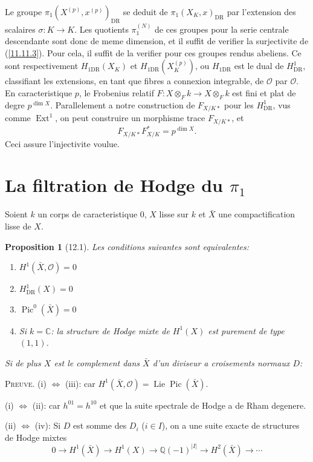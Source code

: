 \documentclass[12pt,a4paper]{article}
\theoremstyle{plain}
\newtheorem{proposition}[theorem]{Proposition}
\theoremstyle{definition}
\theoremstyle{remark}
\DeclareMathOperator{\Lie}{Lie}
\DeclareMathOperator{\Ext}{Ext}
\DeclareMathOperator{\Pic}{Pic}
\newcommand{\Q}{\mathbb{Q}}
\newcommand{\C}{\mathbb{C}}
\newcommand{\DR}{\mathrm{DR}}
\begin{document}
Le groupe $\pi_1(X^{(p)}, x^{(p)})_{\DR}$ se deduit de $\pi_1(X_K, x)_{\DR}$ par l'extension des scalaires $\sigma: K \to K$. Les quotients $\pi_1^{(N)}$ de ces groupes pour la serie centrale descendante sont donc de meme dimension, et il suffit de verifier la surjectivite de (\ref{11.11.3}). Pour cela, il suffit de la verifier pour ces groupes rendus abeliens. Ce sont respectivement $H_{1\DR}(X_K)$ et $H_{1\DR}(X_K^{(p)})$, ou $H_{1\DR}$ est le dual de $H^1_{\DR}$, classifiant les extensions, en tant que fibres a connexion integrable, de $\mathcal{O}$ par $\mathcal{O}$. En caracteristique $p$, le Frobenius relatif $F: X \otimes_F k \to X \otimes_{F} k$ est fini et plat de degre $p^{\dim X}$. Parallelement a notre construction de $F_{X/K *}$ pour les $H^1_{\DR}$, vus comme $\Ext^1$, on peut construire un morphisme trace $F_{X/K *}$, et
$$F_{X/K *} F_{X/K}^* = p^{\dim X}.$$
Ceci assure l'injectivite voulue.


\section{La filtration de Hodge du $\pi_1$}

Soient $k$ un corps de caracteristique 0, $X$ lisse sur $k$ et $\bar{X}$ une compactification lisse de $X$.

\begin{proposition}[12.1]
Les conditions suivantes sont equivalentes:
\begin{enumerate}[label=(\roman*)]
\item $H^1(\bar{X}, \mathcal{O}) = 0$
\item $H^1_{\DR}(X) = 0$
\item $\Pic^0(\bar{X}) = 0$
\item Si $k = \C$: la structure de Hodge mixte de $H^1(X)$ est purement de type $(1,1)$.
\end{enumerate}
Si de plus $X$ est le complement dans $\bar{X}$ d'un diviseur a croisements normaux $D$:
\end{proposition}

\textsc{Preuve.} (i) $\Leftrightarrow$ (iii): car $H^1(\bar{X}, \mathcal{O}) = \Lie \Pic(\bar{X})$.

(i) $\Leftrightarrow$ (ii): car $h^{01} = h^{10}$ et que la suite spectrale de Hodge a de Rham degenere.

(ii) $\Leftrightarrow$ (iv): Si $D$ est somme des $D_i$ ($i \in I$), on a une suite exacte de structures de Hodge mixtes
$$0 \longrightarrow H^1(\bar{X}) \longrightarrow H^1(X) \longrightarrow \Q(-1)^{|I|} \longrightarrow H^2(\bar{X}) \longrightarrow \cdots$$
\end{document}
